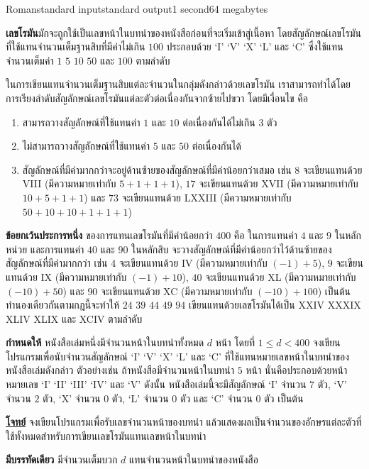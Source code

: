 \documentclass[11pt,a4paper]{article}
\begin{document}
\begin{problem}{Roman}{standard input}{standard output}{1 second}{64 megabytes}

\textbf{เลขโรมัน}มักจะถูกใช้เป็นเลขหน้าในบทนำของหนังสือก่อนที่จะเริ่มเข้าสู่เนื้อหา โดยสัญลักษณ์เลขโรมันที่ใช้แทนจำนวนเต็มฐานสิบที่มีค่าไม่เกิน $100$ ประกอบด้วย ‘I’ ‘V’ ‘X’ ‘L’ และ ‘C’ ซึ่งใช้แทนจำนวนเต็มค่า $1$ $5$ $10$ $50$ และ $100$ ตามลำดับ

ในการเขียนแทนจำนวนเต็มฐานสิบแต่ละจำนวนในกลุ่มดังกล่าวด้วยเลขโรมัน เราสามารถทำได้โดยการเรียงลำดับสัญลักษณ์เลขโรมันแต่ละตัวต่อเนื่องกันจากซ้ายไปขวา โดยมีเงื่อนไข คือ
\begin{enumerate}

\item สามารถวางสัญลักษณ์ที่ใช้แทนค่า $1$ และ $10$ ต่อเนื่องกันได้ไม่เกิน $3$ ตัว
\item ไม่สามารถวางสัญลักษณ์ที่ใช้แทนค่า $5$ และ $50$ ต่อเนื่องกันได้
\item สัญลักษณ์ที่มีค่ามากกว่าจะอยู่ด้านซ้ายของสัญลักษณ์ที่มีค่าน้อยกว่าเสมอ เช่น $8$ จะเขียนแทนด้วย VIII (มีความหมายเท่ากับ $5+1+1+1$), $17$ จะเขียนแทนด้วย XVII (มีความหมายเท่ากับ $10+5+1+1$) และ $73$ จะเขียนแทนด้วย LXXIII (มีความหมายเท่ากับ $50+10+10+1+1+1$)
\end{enumerate}
\textbf{ข้อยกเว้นประการหนึ่ง} ของการแทนเลขโรมันที่มีค่าน้อยกว่า $400$ คือ ในการแทนค่า $4$ และ $9$ ในหลักหน่วย และการแทนค่า $40$ และ $90$ ในหลักสิบ จะวางสัญลักษณ์ที่มีค่าน้อยกว่าไว้ด้านซ้ายของสัญลักษณ์ที่มีค่ามากกว่า เช่น $4$ จะเขียนแทนด้วย IV (มีความหมายเท่ากับ $(-1)+5$), $9$ จะเขียนแทนด้วย IX (มีความหมายเท่ากับ $(-1)+10$), $40$ จะเขียนแทนด้วย XL (มีความหมายเท่ากับ $(-10)+50$) และ $90$ จะเขียนแทนด้วย XC (มีความหมายเท่ากับ $(-10) +100$) เป็นต้น ทำนองเดียวกันตามกฎนี้จะทำให้ $24$ $39$ $44$ $49$ $94$ เขียนแทนด้วยเลขโรมันได้เป็น XXIV XXXIX XLIV XLIX และ XCIV ตามลำดับ

\textbf{กำหนดให้} หนังสือเล่มหนึ่งมีจำนวนหน้าในบทนำทั้งหมด $d$ หน้า โดยที่ $1 \leq d < 400$ จงเขียนโปรแกรมเพื่อนับจำนวนสัญลักษณ์ ‘I’ ‘V’ ‘X’ ‘L’ และ ‘C’ ที่ใช้แทนหมายเลขหน้าในบทนำของหนังสือเล่มดังกล่าว ตัวอย่างเช่น ถ้าหนังสือมีจำนวนหน้าในบทนำ $5$ หน้า นั่นคือประกอบด้วยหน้าหมายเลข ‘I’ ‘II’ ‘III’ ‘IV’ และ ‘V’ ดังนั้น หนังสือเล่มนี้จะมีสัญลักษณ์ ‘I’ จำนวน $7$ ตัว, ‘V’ จำนวน $2$  ตัว, ‘X’ จำนวน $0$ ตัว, ‘L’ จำนวน $0$ ตัว และ ‘C’ จำนวน $0$ ตัว เป็นต้น


\underline{\textbf{โจทย์}} จงเขียนโปรแกรมเพื่อรับเลขจำนวนหน้าของบทนำ แล้วแสดงผลเป็นจำนวนของอักษรแต่ละตัวที่ใช้ทั้งหมดสำหรับการเขียนเลขโรมันแทนเลขหน้าในบทนำ


\InputFile
\textbf{มีบรรทัดเดียว} มีจำนวนเต็มบวก $d$ แทนจำนวนหน้าในบทนำของหนังสือ


\end{problem}
\end{document}
